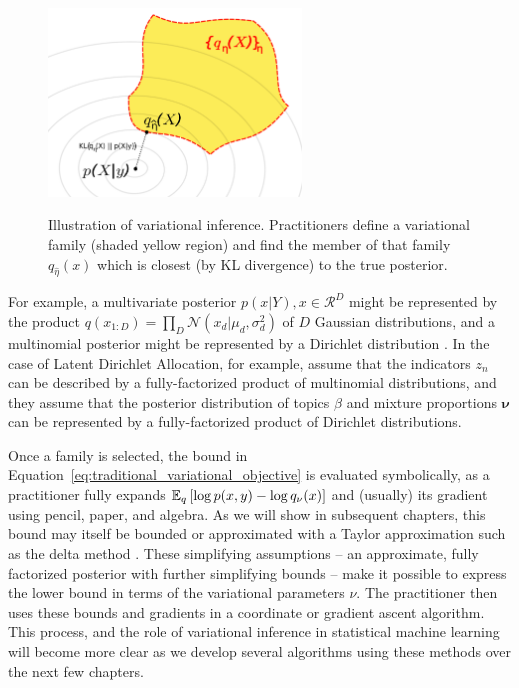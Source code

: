 \begin{figure}
  \center
  \includegraphics[width=0.6\textwidth]{chapter_introductory_material/figs/variational_family.pdf}
  \label{fig:variational_inference}
  \caption{Illustration of variational inference.  Practitioners
    define a variational family (shaded yellow region) and find the
    member of that family $q_{\hat \eta}(x)$ which is closest (by KL
    divergence) to the true posterior.}
\end{figure}
For example, a multivariate posterior $p(x | Y), x \in \mathcal{R}^D$
might be represented by the product $q(x_{1:D}) = \prod_D
\mathcal{N}(x_d | \mu_d, \sigma_d^2)$ of $D$ Gaussian distributions,
and a multinomial posterior might be represented by a Dirichlet
distribution \citep{bishop:2006}.  In the case of Latent Dirichlet
Allocation, for example, \cite{blei:2003} assume that the indicators
$z_n$ can be described by a fully-factorized product of multinomial
distributions, and they assume that the posterior distribution of
topics $\beta$ and mixture proportions $\bm \nu$ can be represented by
a fully-factorized product of Dirichlet distributions.

Once a family is selected, the bound in
Equation~\ref{eq:traditional_variational_objective} is evaluated
symbolically, as a practitioner fully expands $\mathbb{E}_q\left[ \log p(x, y)
  - \log q_\nu(x)\right]$ and (usually) its gradient using pencil, paper,
and algebra. As we will show in subsequent chapters, this bound may
itself be bounded or approximated with a Taylor approximation such as
the delta method \citep{bickel:2007,braun:2007}. These simplifying
assumptions -- an approximate, fully factorized posterior with further
simplifying bounds -- make it possible to express the lower bound in
terms of the variational parameters $\nu$.  The practitioner then uses
these bounds and gradients in a coordinate or gradient ascent
algorithm.  This process, and the role of variational inference in
statistical machine learning will become more clear as we develop
several algorithms using these methods over the next few chapters.

